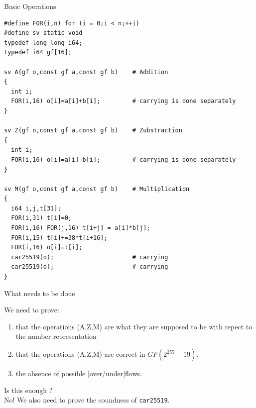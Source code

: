 \documentclass[8pt]{beamer}
\begin{document}
%
%
\begin{frame}[fragile]{Basic Operations}
  \begin{center}

\begin{lstlisting}[language=cnacl, caption=Basic Operations, label=cod:languageC31]
#define FOR(i,n) for (i = 0;i < n;++i)
#define sv static void
typedef long long i64;
typedef i64 gf[16];

sv A(gf o,const gf a,const gf b)    # Addition
{
  int i;
  FOR(i,16) o[i]=a[i]+b[i];         # carrying is done separately
}

sv Z(gf o,const gf a,const gf b)    # Zubstraction
{
  int i;
  FOR(i,16) o[i]=a[i]-b[i];         # carrying is done separately
}

sv M(gf o,const gf a,const gf b)    # Multiplication
{
  i64 i,j,t[31];
  FOR(i,31) t[i]=0;
  FOR(i,16) FOR(j,16) t[i+j] = a[i]*b[j];
  FOR(i,15) t[i]+=38*t[i+16];
  FOR(i,16) o[i]=t[i];
  car25519(o);                      # carrying
  car25519(o);                      # carrying
}
\end{lstlisting}

  \end{center}
\end{frame}


%
%
\begin{frame}[fragile]{What needs to be done}
  \begin{center}

  We need to prove:
  \begin{enumerate}
    \item that the operations (A,Z,M) are what they are supposed to be with repect to the number representation
    \item that the operations (A,Z,M) are correct in $GF(2^{255}-19)$.
    \item the absence of possible [over/under]flows.
  \end{enumerate}
  \pause
  \vspace{1cm}
  {\Large Is this enough ?}\\
  \pause
  No! We also need to prove the soundness of {\color[rgb]{0.5,0,0.5}\texttt{car25519}}.
  \end{center}
\end{frame}
\end{document}
